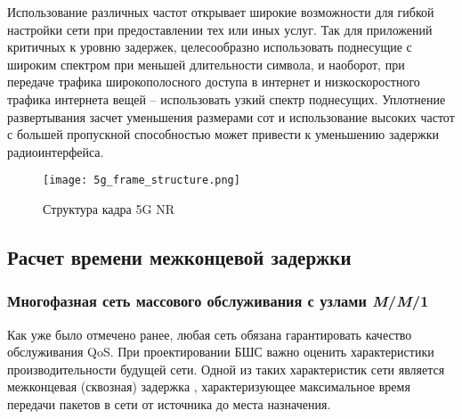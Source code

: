 Использование различных частот открывает широкие возможности для гибкой настройки сети при предоставлении тех или иных услуг. Так для приложений критичных к уровню задержек, целесообразно использовать поднесущие с широким спектром при меньшей длительности символа, и наоборот, при передаче трафика широкополосного доступа в интернет и низкоскоростного трафика интернета вещей -- использовать узкий спектр поднесущих. Уплотнение развертывания засчет уменьшения размерами сот и использование высоких частот с большей пропускной способностью может привести к уменьшению задержки радиоинтерфейса.


\begin{figure}[h!]
  \centering
   \texttt{[image: 5g\_frame\_structure.png]}
\caption{Структура кадра 5G NR}
\label{fig:part1_5g_frame_structure}
\end{figure}


\subsection{Расчет времени межконцевой задержки}\label{part4_e2e_delay_section}


\subsubsection{Многофазная сеть массового обслуживания с узлами \textit{M}/\textit{M}/1}

Как уже было отмечено ранее, любая сеть обязана гарантировать качество обслуживания QoS. При проектировании БШС важно оценить характеристики производительности будущей сети. Одной из таких характеристик сети является межконцевая (сквозная) задержка \cite{Vishnevsky2016_Methods_of_performance, Wang2017, Liu2016, Chen2019, Hosni2017, Capone2019, Abbas2017, Seliem2019, Malandra2018, Kalor2018, Larionov2019, Gao2016}, характеризующее максимальное время передачи пакетов в сети от источника до места назначения.

